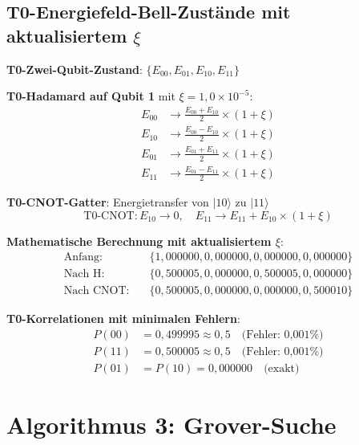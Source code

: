 \documentclass[12pt,a4paper]{article}
\newcommand{\Efield}{E}
\begin{document}
	\subsection{T0-Energiefeld-Bell-Zustände mit aktualisiertem $\xi$}
	
	\textbf{T0-Zwei-Qubit-Zustand}: $\{\Efield_{00}, \Efield_{01}, \Efield_{10}, \Efield_{11}\}$
	
	\textbf{T0-Hadamard auf Qubit 1} mit $\xi = 1,0 \times 10^{-5}$:
	\begin{align}
		\Efield_{00} &\rightarrow \frac{\Efield_{00} + \Efield_{10}}{2} \times (1 + \xi) \\
		\Efield_{10} &\rightarrow \frac{\Efield_{00} - \Efield_{10}}{2} \times (1 + \xi) \\
		\Efield_{01} &\rightarrow \frac{\Efield_{01} + \Efield_{11}}{2} \times (1 + \xi) \\
		\Efield_{11} &\rightarrow \frac{\Efield_{01} - \Efield_{11}}{2} \times (1 + \xi)
	\end{align}
	
	\textbf{T0-CNOT-Gatter}: Energietransfer von $|10\rangle$ zu $|11\rangle$
	\begin{equation}
		\text{T0-CNOT}: \Efield_{10} \rightarrow 0, \quad \Efield_{11} \rightarrow \Efield_{11} + \Efield_{10} \times (1 + \xi)
	\end{equation}
	
	\textbf{Mathematische Berechnung mit aktualisiertem $\xi$}:
	\begin{align}
		\text{Anfang}: \quad &\{1,000000, 0,000000, 0,000000, 0,000000\} \\
		\text{Nach H}: \quad &\{0,500005, 0,000000, 0,500005, 0,000000\} \\
		\text{Nach CNOT}: \quad &\{0,500005, 0,000000, 0,000000, 0,500010\}
	\end{align}
	
	\textbf{T0-Korrelationen mit minimalen Fehlern}:
	\begin{align}
		P(00) &= 0,499995 \approx 0,5 \quad \text{(Fehler: 0,001\%)} \\
		P(11) &= 0,500005 \approx 0,5 \quad \text{(Fehler: 0,001\%)} \\
		P(01) &= P(10) = 0,000000 \quad \text{(exakt)}
	\end{align}
	
	\section{Algorithmus 3: Grover-Suche}
	
\end{document}
